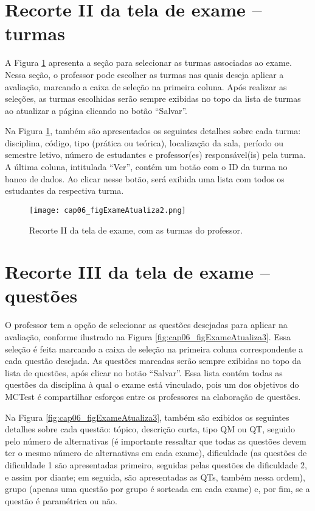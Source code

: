 \section{Recorte II da tela de exame -- turmas}\label{sec:exameTurmas}

A Figura \ref{fig:cap06_figExameAtualiza2} apresenta a seção para selecionar as turmas associadas ao exame. Nessa seção, o professor pode escolher as turmas nas quais deseja aplicar a avaliação, marcando a caixa de seleção na primeira coluna. Após realizar as seleções, as turmas escolhidas serão sempre exibidas no topo da lista de turmas ao atualizar a página clicando no botão ``Salvar''. 

Na Figura \ref{fig:cap06_figExameAtualiza2}, também são apresentados os seguintes detalhes sobre cada turma: disciplina, código, tipo (prática ou teórica), localização da sala, período ou semestre letivo, número de estudantes e professor(es) responsável(is) pela turma. A última coluna, intitulada ``Ver'', contém um botão com o ID da turma no banco de dados. Ao clicar nesse botão, será exibida uma lista com todos os estudantes da respectiva turma.

\begin{figure}[htbp]
  \centering
  \texttt{[image: cap06\_figExameAtualiza2.png]}
  \caption{Recorte II da tela de exame, com as turmas do professor.}
  \label{fig:cap06_figExameAtualiza2}\vspace{-3mm}
\end{figure}

\section{Recorte III da tela de exame -- questões}

O professor tem a opção de selecionar as questões desejadas para aplicar na avaliação, conforme ilustrado na Figura \ref{fig:cap06_figExameAtualiza3}. Essa seleção é feita marcando a caixa de seleção na primeira coluna correspondente a cada questão desejada. As questões marcadas serão sempre exibidas no topo da lista de questões, após clicar no botão ``Salvar''. Essa lista contém todas as questões da disciplina à qual o exame está vinculado, pois um dos objetivos do MCTest é compartilhar esforços entre os professores na elaboração de questões.

Na Figura \ref{fig:cap06_figExameAtualiza3}, também são exibidos os seguintes detalhes sobre cada questão: tópico, descrição curta, tipo QM ou QT, seguido pelo número de alternativas (é importante ressaltar que todas as questões devem ter o mesmo número de alternativas em cada exame), dificuldade (as questões de dificuldade 1 são apresentadas primeiro, seguidas pelas questões de dificuldade 2, e assim por diante; em seguida, são apresentadas as QTs, também nessa ordem), grupo (apenas uma questão por grupo é sorteada em cada exame) e, por fim, se a questão é paramétrica ou não.

